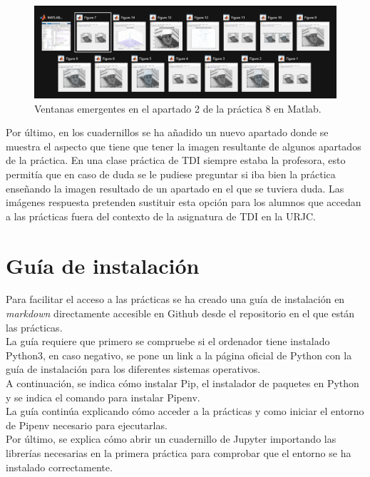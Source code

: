 \documentclass[a4paper,12pt]{report}
\begin{document}
\begin{figure}[h]
\centering
\includegraphics[width=1\textwidth]{imagenes/ventanas}
\caption{Ventanas emergentes en el apartado 2 de la práctica 8 en Matlab.}
\label{ventanas}
\end{figure}

Por último, en los cuadernillos se ha añadido un nuevo apartado donde se muestra el aspecto que tiene que tener la imagen resultante de algunos apartados de la práctica. En una clase práctica de TDI siempre estaba la profesora, esto permitía que en caso de duda se le pudiese preguntar si iba bien la práctica enseñando la imagen resultado de un apartado en el que se tuviera duda. Las imágenes respuesta pretenden sustituir esta opción para los alumnos que accedan a las prácticas fuera del contexto de la asignatura de TDI en la URJC.


\section{Guía de instalación}

Para facilitar el acceso a las prácticas se ha creado una guía de instalación en \emph{markdown} directamente accesible en Github desde el repositorio en el que están las prácticas.\\

La guía requiere que primero se compruebe si el ordenador tiene instalado Python3, en caso negativo, se pone un link a la página oficial de Python con la guía de instalación para los diferentes sistemas operativos.\\

A continuación, se indica cómo instalar Pip, el instalador de paquetes en Python y se indica el comando para instalar Pipenv.\\

La guía continúa explicando cómo acceder a la prácticas y como iniciar el entorno de Pipenv necesario para ejecutarlas.\\

Por último, se explica cómo abrir un cuadernillo de Jupyter importando las librerías necesarias en la primera práctica para comprobar que el entorno se ha instalado correctamente.\\
\end{document}
